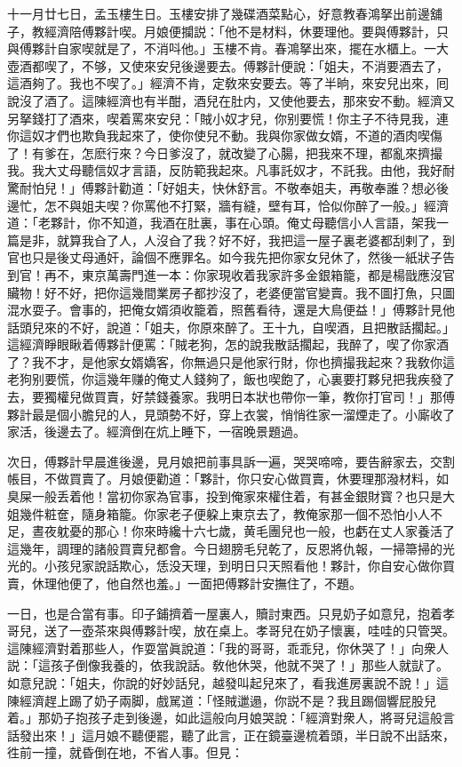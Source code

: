 十一月廿七日，孟玉樓生日。玉樓安排了幾碟酒菜點心，好意教春鴻拏出前邊舖子，教經濟陪傅夥計喫。月娘便攔説：「他不是材料，休要理他。要與傅夥計，只與傅夥計自家喫就是了，不消呌他。」玉樓不肯。春鴻拏出來，擺在水櫃上。一大壺酒都喫了，不够，又使來安兒後邊要去。傅夥計便說：「姐夫，不消要酒去了，這酒夠了。我也不喫了。」經濟不肯，定敎來安要去。等了半晌，來安兒出來，囘說沒了酒了。這陳經濟也有半酣，酒兒在肚内，又使他要去，那來安不動。經濟又另拏錢打了酒來，喫着罵來安兒：「賊小奴才兒，你别要慌！你主子不待見我，連你這奴才們也欺負我起來了，使你使兒不動。我與你家做女婿，不道的酒肉喫傷了！有爹在，怎麽行來？今日爹沒了，就改變了心腸，把我來不理，都亂來擠撮我。我大丈母聽信奴才言語，反防範我起來。凡事託奴才，不託我。由他，我好耐驚耐怕兒！」傅夥計勸道：「好姐夫，快休舒言。不敬奉姐夫，再敬奉誰？想必後邊忙，怎不與姐夫喫？你罵他不打緊，牆有縫，壁有耳，恰似你醉了一般。」經濟道：「老夥計，你不知道，我酒在肚裏，事在心頭。俺丈母聽信小人言語，架我一篇是非，就算我㒲了人，人沒㒲了我？好不好，我把這一屋子裏老婆都刮剌了，到官也只是後丈母通奸，論個不應罪名。如今我先把你家女兒休了，然後一紙狀子告到官！再不，東京萬壽門進一本：你家現收着我家許多金銀箱籠，都是楊戩應沒官贜物！好不好，把你這幾間業房子都抄沒了，老婆便當官變賣。我不圖打魚，只圖混水耍子。會事的，把俺女婿須收籠着，照舊看待，還是大鳥便益！」傅夥計見他話頭兒來的不好，說道：「姐夫，你原來醉了。王十九，自喫酒，且把散話擱起。」這經濟睜眼瞅着傅夥計便罵：「賊老狗，怎的說我散話擱起，我醉了，喫了你家酒了？我不才，是他家女婿嬌客，你無過只是他家行財，你也擠撮我起來？我敎你這老狗别要慌，你這幾年赚的俺丈人錢夠了，飯也喫飽了，心裏要打夥兒把我疾發了去，要獨權兒做買賣，好禁錢養家。我明日本狀也帶你一筆，教你打官司！」那傅夥計最是個小膽兒的人，見頭勢不好，穿上衣裳，悄悄徃家一溜煙走了。小廝收了家活，後邊去了。經濟倒在炕上睡下，一宿晚景題過。

次日，傅夥計早晨進後邊，見月娘把前事具訴一遍，哭哭啼啼，要告辭家去，交割帳目，不做買賣了。月娘便勸道：「夥計，你只安心做買賣，休要理那潑材料，如臭屎一般丢着他！當初你家為官事，投到俺家來權住着，有甚金銀財寳？也只是大姐幾件粧奩，隨身箱籠。你家老子便躱上東京去了，教俺家那一個不恐怕小人不足，晝夜躭憂的那心！你來時纔十六七歲，黄毛團兒也一般，也虧在丈人家養活了這幾年，調理的諸般買賣兒都會。今日翅膀毛兒乾了，反恩將仇報，一掃箒掃的光光的。小孩兒家說話欺心，恁没天理，到明日只天照看他！夥計，你自安心做你買賣，休理他便了，他自然也羞。」一面把傅夥計安撫住了，不題。

一日，也是合當有事。印子鋪擠着一屋裏人，贖討東西。只見奶子如意兒，抱着孝哥兒，送了一壺茶來與傅夥計喫，放在桌上。孝哥兒在奶子懷裏，哇哇的只管哭。這陳經濟對着那些人，作耍當眞說道：「我的哥哥，乖乖兒，你休哭了！」向衆人説：「這孩子倒像我養的，依我說話。敎他休哭，他就不哭了！」那些人就獃了。如意兒說：「姐夫，你說的好妙話兒，越發叫起兒來了，看我進房裏說不說！」這陳經濟趕上踢了奶子兩脚，戲駡道：「怪賊邋遢，你説不是？我且踢個響屁股兒着。」那奶子抱孩子走到後邊，如此這般向月娘哭說：「經濟對衆人，將哥兒這般言話發出來！」這月娘不聽便罷，聽了此言，正在鏡臺邊梳着頭，半日說不出話來，徃前一撞，就昏倒在地，不省人事。但見：

